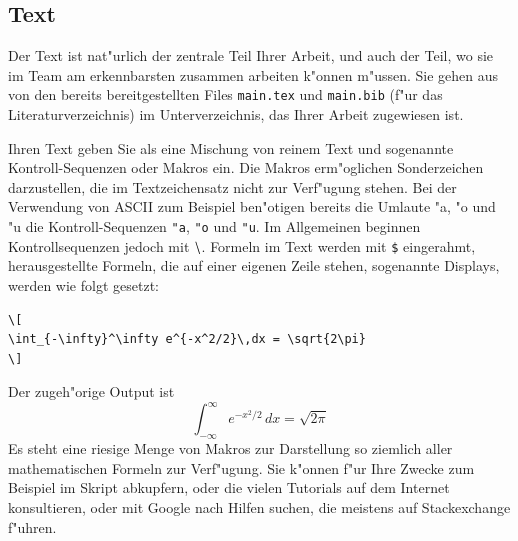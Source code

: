 \documentclass[a4paper,12pt]{article}
\begin{document}
\subsection{Text}
Der Text ist nat"urlich der zentrale Teil Ihrer Arbeit, und auch der
Teil, wo sie im Team am erkennbarsten zusammen arbeiten k"onnen m"ussen.
Sie gehen aus von den bereits bereitgestellten Files \verb+main.tex+
und \verb+main.bib+ (f"ur das Literaturverzeichnis) im Unterverzeichnis,
das Ihrer Arbeit zugewiesen ist.

Ihren Text geben Sie als eine Mischung von reinem Text und sogenannte
Kontroll-Sequenzen oder Makros ein.
Die Makros erm"oglichen Sonderzeichen darzustellen, die im Textzeichensatz
nicht zur Verf"ugung stehen.
Bei der Verwendung von ASCII zum Beispiel ben"otigen bereits die Umlaute
"a, "o und "u
die Kontroll-Sequenzen 
\verb+"a+,
\verb+"o+ und
\verb+"u+.
Im Allgemeinen beginnen Kontrollsequenzen jedoch mit $\tt{\backslash}$.
Formeln im Text werden mit \verb+$+ eingerahmt, herausgestellte Formeln,
die auf einer eigenen Zeile stehen, sogenannte Displays, werden wie folgt
gesetzt:
\begin{verbatim}
\[
\int_{-\infty}^\infty e^{-x^2/2}\,dx = \sqrt{2\pi}
\]
\end{verbatim}
Der zugeh"orige Output ist
\[
\int_{-\infty}^\infty e^{-x^2/2}\,dx = \sqrt{2\pi}
\]
Es steht eine riesige Menge von Makros zur Darstellung so ziemlich
aller mathematischen Formeln zur Verf"ugung.
Sie k"onnen f"ur Ihre Zwecke zum Beispiel im Skript abkupfern, oder
die vielen Tutorials auf dem Internet konsultieren, oder mit Google
nach Hilfen suchen, die meistens auf Stackexchange f"uhren.
\end{document}
